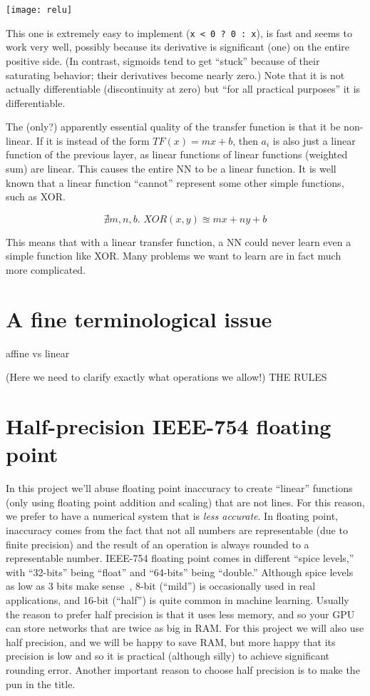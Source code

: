 \documentclass[twocolumn]{article}
\begin{document}
\begin{center}
\texttt{[image: relu]}
\end{center}

This one is extremely easy to implement (\verb+x < 0 ? 0 : x+), is fast
and seems to work very well, possibly because its derivative is
significant (one) on the entire positive side. (In contrast, sigmoids
tend to get ``stuck'' because of their saturating behavior; their
derivatives become nearly zero.) Note that it is not actually
differentiable (discontinuity at zero) but ``for all practical
purposes'' it is differentiable.

The (only?) apparently essential quality of the transfer function is
that it be non-linear. If it is instead of the form $TF(x) = mx + b$,
then $a_i$ is also just a linear function of the previous layer, as
linear functions of linear functions (weighted sum) are linear. This
causes the entire NN to be a linear function. It is well known that a
linear function ``cannot'' represent some other simple functions, such
as XOR.

$$\nexists m,n,b.\,\, XOR(x, y) \approxeq m x + n y + b$$

This means that with a linear transfer function, a NN could never
learn even a simple function like XOR. Many problems we want to learn
are in fact much more complicated.

\section{A fine terminological issue}
affine vs linear

(Here we need to clarify exactly what operations we allow!) THE RULES


\section{Half-precision IEEE-754 floating point}
In this project we'll abuse floating point inaccuracy to create
``linear'' functions (only using floating point addition and scaling)
that are not lines. For this reason, we prefer to have a numerical
system that is {\em less accurate}. In floating point, inaccuracy comes
from the fact that not all numbers are representable (due to finite
precision) and the result of an operation is always rounded to a
representable number. IEEE-754 floating point comes in different
``spice levels,'' with ``32-bits'' being ``float'' and ``64-bits''
being ``double.'' Although spice levels as low as 3 bits make
sense~\cite{murphy2019nan}, 8-bit (``mild'') is occasionally used in
real applications, and 16-bit (``half'') is quite common in machine
learning. Usually the reason to prefer half precision is that it uses
less memory, and so your GPU can store networks that are twice as big
in RAM. For this project we will also use half precision, and we will
be happy to save RAM, but more happy that its precision is low and so
it is practical (although silly) to achieve significant rounding
error. Another important reason to choose half precision is to make
the pun in the title.
\end{document}
